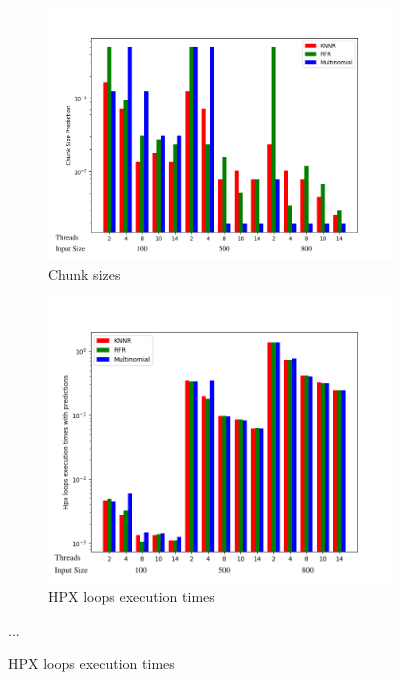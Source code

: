 \documentclass[12pt]{article}
\begin{document}
\begin{figure}[h]
	\centering
	\begin{subfigure}[b]{0.515\textwidth}
		\centering
		\includegraphics[width=\textwidth]{images/matrix_mult_prediction_bars.png}
		\caption[Network2]%
		{{Chunk sizes}}    
	\end{subfigure}
	\hfill
	\begin{subfigure}[b]{0.475\textwidth}  
		\centering 
		\includegraphics[width=\textwidth]{images/matrix_mult_times_bars.png}
		\caption[]%
		{{HPX loops execution times}}    
	\end{subfigure}
	{...} 
	
\end{figure}
\end{document}
